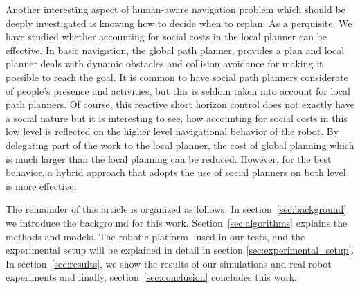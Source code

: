 Another interesting aspect of human-aware navigation problem which should be deeply investigated is knowing how to decide when to replan. As a perquisite, We have studied whether accounting for social costs in the local planner can be effective. In basic navigation, the global path planner, provides a plan and local planner deals with dynamic obstacles and collision avoidance for making it possible to reach the goal. It is common to have social path planners considerate of people's presence and activities, but this is seldom taken into account for local path planners. Of course, this reactive short horizon control does not exactly have a social nature but it is interesting to see, how accounting for social costs in this low level is reflected on the higher level navigational behavior of the robot. By delegating part of the work to the local planner, the cost of global planning which is much larger than the local planning can be reduced. However, for the best behavior, a hybrid approach that adopts the use of social planners on both level is more effective.    

The remainder of this article is organized as follows. In section~\ref{sec:background} we introduce the background for this work. Section~\ref{sec:algorithms} explains the methods and models. The robotic platform~\cite{Messias2014robotic} used in our tests, and the experimental setup will be explained in detail in section \ref{sec:experimental_setup}. In section~\ref{sec:results}, we show the results of our simulations and real robot experiments and finally, section~\ref{sec:conclusion} concludes this work.







